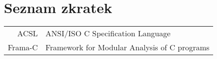 \documentclass[czech,bachelor,unicode]{ctufit-thesis}
\theoremstyle{plain}
\theoremstyle{definition}
\theoremstyle{remark}
\numberwithin{theorem}{chapter}
\begin{document}
\printabstractpage %

%
%
%
%
%
%
%
%
%

\chapter{Seznam zkratek}
	
\begin{tabular}{rl}
ACSL & ANSI/ISO C Specification Language\\
Frama-C & Framework for Modular Analysis of C programs
\end{tabular}

\mainmatter\mainmatterinit %



\appendix\appendixinit %


\backmatter %

\printbibliography %

\end{document}
